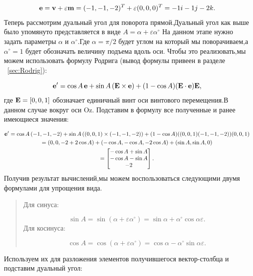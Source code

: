 \begin{equation*}
    \vb{e} = \vb{v} + \varepsilon \vb{m} = ( -1, -1,  -2)^T + \varepsilon (0, 0, 0)^T = -1i -1j -2k.
\end{equation*}
Теперь рассмотрим дуальный угол для поворота прямой.Дуальный угол как выше было упомянуто представляется в виде \(A = \alpha + \varepsilon \alpha^\circ\)
На данном этапе нужно задать параметры \(\alpha\) и \(\alpha^\circ\).Где \(\alpha = \pi/2\) будет углом на который мы поворачиваем,а 
\(\alpha^\circ=1\) будет обозначать величину подъема вдоль оси.
Чтобы это реализовать,мы можем использовать формулу Родрига (вывод формулы привеен в разделе ~\ref{sec:Rodrig}):

\begin{equation*}
    \vb{e}' = \cos A \, \vb{e} + \sin A \, (\vb{E} \times \vb{e}) + 
    (1 - \cos A)(\vb{E} \cdot \vb{e}) \vb{E},
\end{equation*}
где \(\vb{E}=[0, 0, 1]\) обозначает единичный винт оси винтового перемещения.В данном случае вокруг оси Oz.
Подставим в формулу все полученные и ранее имеющиеся значения:

\begin{multline*}
    \vb{e}' = \cos A \, (-1, -1, -2) + \sin A \, ((0, 0, 1) \times (-1, -1, -2)) + (1 - \cos A)((0, 0, 1) (-1, -1, -2)) (0, 0, 1) \\
    =(0, 0, -2 + 2 \cos A) + (- \cos A, - \cos A, -2 \cos A) + (\sin A, \sin A, 0) \\
    = \begin{bmatrix}
        - \cos A + \sin A \\
        - \cos A - \sin A \\
        -2
    \end{bmatrix}.
\end{multline*}
Получив результат вычислений,мы можем воспользоваться следующими двумя формулами для упрощения вида.
\begin{quote}
    Для синуса:

    \begin{equation*}
        \sin A = \sin (\alpha + \varepsilon \alpha^\circ) = \sin \alpha + \alpha^\circ \cos \alpha \varepsilon .
    \end{equation*}
    Для косинуса:

    \begin{equation*}
        \cos A = \cos (\alpha + \varepsilon \alpha^\circ) = \cos \alpha - \alpha^\circ \sin \alpha \varepsilon .
    \end{equation*}
    \end{quote}
Используем их для разложения элементов получившегося вектор-столбца и подставим дуальный угол:

